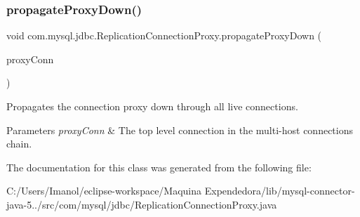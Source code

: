 \subsubsection{\texorpdfstring{propagate\+Proxy\+Down()}{propagateProxyDown()}}
{\footnotesize\ttfamily void com.\+mysql.\+jdbc.\+Replication\+Connection\+Proxy.\+propagate\+Proxy\+Down (\begin{DoxyParamCaption}\item[{\mbox{\hyperlink{interfacecom_1_1mysql_1_1jdbc_1_1_my_s_q_l_connection}{My\+S\+Q\+L\+Connection}}}]{proxy\+Conn }\end{DoxyParamCaption})\hspace{0.3cm}{\ttfamily [protected]}}

Propagates the connection proxy down through all live connections.


\begin{DoxyParams}{Parameters}
{\em proxy\+Conn} & The top level connection in the multi-\/host connections chain. \\
\hline
\end{DoxyParams}


The documentation for this class was generated from the following file\+:\begin{DoxyCompactItemize}
\item 
C\+:/\+Users/\+Imanol/eclipse-\/workspace/\+Maquina Expendedora/lib/mysql-\/connector-\/java-\/5../src/com/mysql/jdbc/Replication\+Connection\+Proxy.\+java\end{DoxyCompactItemize}
